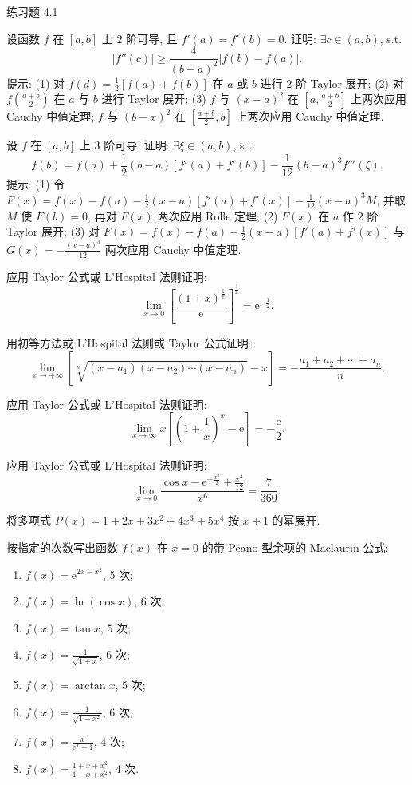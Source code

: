 \begin{exblock}{练习题 4.1}
  \item 设函数 $f$ 在 $[a,b]$ 上 $2$ 阶可导, 且 $f'(a)=f'(b)=0$. 证明: $\exists c\in(a,b)$, s.t.
  \[
  |f''(c)|\geqslant\frac{4}{(b-a)^{2}}|f(b)-f(a)|.
\]
  提示: (1) 对 $f(d)=\frac{1}{2}[f(a)+f(b)]$ 在 $a$ 或 $b$ 进行 $2$ 阶 Taylor 展开; (2) 对 $f\left(\frac{a+b}{2}\right)$ 在 $a$ 与 $b$ 进行 Taylor 展开; (3) $f$ 与 $(x-a)^{2}$ 在 $\left[a,\frac{a+b}{2}\right]$ 上两次应用 Cauchy 中值定理; $f$ 与 $(b-x)^{2}$ 在 $\left[\frac{a+b}{2},b\right]$ 上两次应用 Cauchy 中值定理.

  \item 设 $f$ 在 $[a,b]$ 上 $3$ 阶可导, 证明: $\exists \xi\in(a,b)$, s.t.
  \[
  f(b)=f(a)+\frac{1}{2}(b-a)[f'(a)+f'(b)]-\frac{1}{12}(b-a)^{3}f'''(\xi).
\]
  提示: (1) 令 $F(x)=f(x)-f(a)-\frac{1}{2}(x-a)[f'(a)+f'(x)]-\frac{1}{12}(x-a)^{3}M$, 并取 $M$ 使 $F(b)=0$, 再对 $F(x)$ 两次应用 Rolle 定理; (2) $F(x)$ 在 $a$ 作 $2$ 阶 Taylor 展开; (3) 对 $F(x)=f(x)-f(a)-\frac{1}{2}(x-a)[f'(a)+f'(x)]$ 与 $G(x)=-\frac{(x-a)^{3}}{12}$ 两次应用 Cauchy 中值定理.

  \item 应用 Taylor 公式或 L'Hospital 法则证明:
  \[
  \lim_{x\to 0}\left[\frac{(1+x)^{\frac{1}{x}}}{\mathrm{e}}\right]^{\frac{1}{x}}=\mathrm{e}^{-\frac{1}{2}}.
\]

  \item 用初等方法或 L'Hospital 法则或 Taylor 公式证明:
  \[
  \lim_{x\to+\infty}\left[\sqrt[n]{(x-a_{1})(x-a_{2})\cdots(x-a_{n})}-x\right]=-\frac{a_{1}+a_{2}+\cdots+a_{n}}{n}.
\]

  \item 应用 Taylor 公式或 L'Hospital 法则证明:
  \[
  \lim_{x\to\infty}x\left[\left(1+\frac{1}{x}\right)^{x}-\mathrm{e}\right]=-\frac{\mathrm{e}}{2}.
\]

  \item 应用 Taylor 公式或 L'Hospital 法则证明:
  \[
  \lim_{x\to 0}\frac{\cos x-\mathrm{e}^{-\frac{x^{2}}{2}}+\frac{x^{4}}{12}}{x^{6}}=\frac{7}{360}.
\]

  \item 将多项式 $P(x)=1+2x+3x^{2}+4x^{3}+5x^{4}$ 按 $x+1$ 的幂展开.

  \item 按指定的次数写出函数 $f(x)$ 在 $x=0$ 的带 Peano 型余项的 Maclaurin 公式:
  \begin{enumerate}[label=(\arabic*)]
    \item $f(x)=\mathrm{e}^{2x-x^{2}}$, $5$ 次;
    \item $f(x)=\ln(\cos x)$, $6$ 次;
    \item $f(x)=\tan x$, $5$ 次;
    \item $f(x)=\frac{1}{\sqrt{1+x}}$, $6$ 次;
    \item $f(x)=\arctan x$, $5$ 次;
    \item $f(x)=\frac{1}{\sqrt{1-x^{2}}}$, $6$ 次;
    \item $f(x)=\frac{x}{\mathrm{e}^{x}-1}$, $4$ 次;
    \item $f(x)=\frac{1+x+x^{2}}{1-x+x^{2}}$, $4$ 次.
  \end{enumerate}


\end{exblock}
